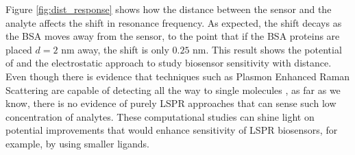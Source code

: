 Figure \ref{fig:dist_response} shows how the distance between the sensor 
and the analyte affects the shift in resonance frequency. As expected, the shift decays 
as the BSA moves away from the sensor, to the point that if the BSA proteins are placed
$d=2$ nm away, the shift is only $0.25$ nm. This result shows the potential of \pygbe 
and the electrostatic approach to study biosensor sensitivity with distance.
Even though there is evidence that techniques such as Plasmon Enhanced Raman Scattering are capable of detecting all the way to single molecules \cite{ZhangZhangETal2013}, 
as far as we know, there is no evidence of purely LSPR approaches that can sense such low concentration of analytes.
These computational studies can shine light on
potential improvements that would enhance sensitivity of LSPR biosensors, for example, by using
smaller ligands. 



